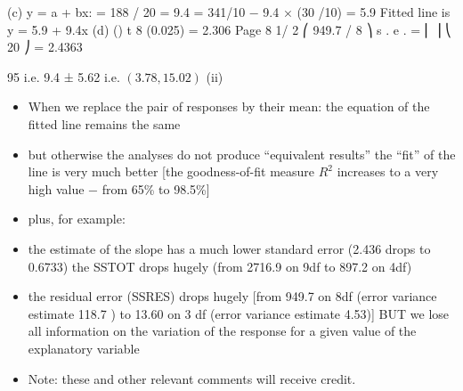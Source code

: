 \documentclass[a4paper,12pt]{article}
\begin{document}
(c)
y = a + bx:
 = 188 / 20 = 9.4
= 341/10 − 9.4 × (30 /10) = 5.9
Fitted line is y = 5.9 + 9.4x
(d)
()
t 8 (0.025) = 2.306
Page 8
1/ 2
⎛ 949.7 / 8 ⎞
s . e .  = ⎜
⎟
⎝ 20 ⎠
= 2.4363

95%
i.e. 9.4 ± 5.62 i.e. $(3.78, 15.02)$
(ii)
\begin{itemize}
\item When we replace the pair of responses by their mean: the equation of the fitted line remains the same
\item but otherwise the analyses do not produce “equivalent results”
the “fit” of the line is very much better [the goodness-of-fit measure $R^2$ increases to a very high value − from 65\% to 98.5\%]
\item plus, for example:
\item the estimate of the slope has a much lower standard error (2.436 drops to 0.6733)
the SSTOT drops hugely (from 2716.9 on 9df to 897.2 on 4df)
\item the residual error (SSRES) drops hugely [from 949.7 on 8df (error variance estimate 118.7 ) to 13.60 on 3 df (error variance estimate 4.53)]
BUT we lose all information on the variation of the response for a given value of the explanatory variable
\item Note: these and other relevant comments will receive credit.
\end{itemize}
\end{document}
